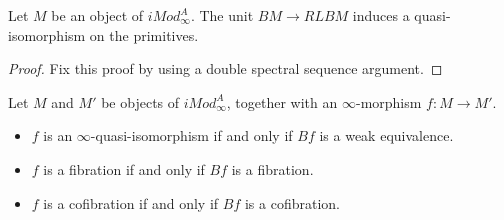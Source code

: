 \documentclass[../thesis.tex]{subfiles}
\begin{document}
            \begin{lemma}
                Let $M$ be an object of $iMod_\infty^A$. The unit $BM \to RLBM$ induces a quasi-isomorphism on the primitives.
            \end{lemma}

            \begin{proof}
                Fix this proof by using a double spectral sequence argument.
            \end{proof}

            \begin{proposition}
                Let $M$ and $M'$ be objects of $iMod_\infty^A$, together with an $\infty$-morphism $f : M \to M'$.
                \begin{itemize}
                    \item $f$ is an $\infty$-quasi-isomorphism if and only if $Bf$ is a weak equivalence.
                    \item $f$ is a fibration if and only if $Bf$ is a fibration.
                    \item $f$ is a cofibration if and only if $Bf$ is a cofibration.
                \end{itemize}
            \end{proposition}
\end{document}
